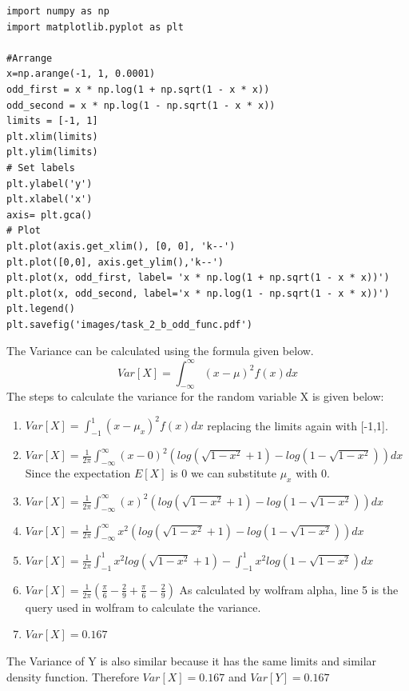 \begin{lstlisting}[caption={Code Task 2 b},label={lst:code_task_2_b}]
import numpy as np
import matplotlib.pyplot as plt

#Arrange
x=np.arange(-1, 1, 0.0001)
odd_first = x * np.log(1 + np.sqrt(1 - x * x))
odd_second = x * np.log(1 - np.sqrt(1 - x * x))
limits = [-1, 1]
plt.xlim(limits)
plt.ylim(limits)
# Set labels
plt.ylabel('y')
plt.xlabel('x')
axis= plt.gca()
# Plot
plt.plot(axis.get_xlim(), [0, 0], 'k--')
plt.plot([0,0], axis.get_ylim(),'k--')
plt.plot(x, odd_first, label= 'x * np.log(1 + np.sqrt(1 - x * x))')
plt.plot(x, odd_second, label='x * np.log(1 - np.sqrt(1 - x * x))')
plt.legend()
plt.savefig('images/task_2_b_odd_func.pdf')
\end{lstlisting}
\newpage The Variance can be calculated using the formula given below.
\begin{equation}
    Var[X]=\int_{-\infty}^{\infty}(x-\mu)^2f(x) dx
\end{equation}
The steps to calculate the variance for the random variable X is given below:
\begin{enumerate}
    \item $Var[X]=\int_{-1}^{1}(x-\mu_x)^2f(x) dx$ replacing the limits again with [-1,1].
    \item $Var[X]= \frac{1}{2\pi} \int_{-\infty}^{\infty}(x-0)^2  (log(\sqrt{1-x^2}+1)- log(1-\sqrt{1-x^2}))dx$ Since the expectation $E[X]$ is 0 we can substitute $\mu_x$ with 0.
    \item $Var[X]= \frac{1}{2\pi} \int_{-\infty}^{\infty}(x)^2  (log(\sqrt{1-x^2}+1)- log(1-\sqrt{1-x^2}))dx$
    \item $Var[X]= \frac{1}{2\pi} \int_{-\infty}^{\infty}x^2  (log(\sqrt{1-x^2}+1)- log(1-\sqrt{1-x^2}))dx$
    \item $Var[X]= \frac{1}{2\pi} \int_{-1}^{1}x^2log(\sqrt{1-x^2}+1)- \int_{-1}^{1} x^2log(1-\sqrt{1-x^2})dx$
    \item $Var[X]=\frac{1}{2\pi}(\frac{\pi}{6}-\frac{2}{9}+\frac{\pi}{6}-\frac{2}{9})$ As calculated by wolfram alpha, line 5 is the query used in wolfram to calculate the variance.
     \item $Var[X]=0.167$
\end{enumerate}
The Variance of Y is also similar because it has the same limits and similar density function. Therefore $Var[X] = 0.167$ and $Var[Y] = 0.167$